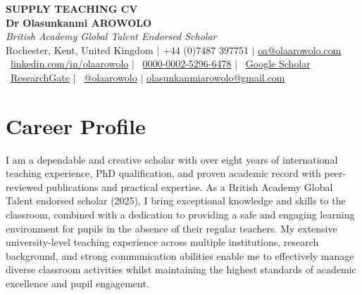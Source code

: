 \documentclass[a4paper,11pt]{article}
\begin{document}
\begin{center}
    \textbf{\Huge \scshape SUPPLY TEACHING CV} \\
    \vspace{5pt}
    \textbf{\Large Dr Olasunkanmi AROWOLO} \\ \vspace{1pt}
    \small \textit{British Academy Global Talent Endorsed Scholar} \\
    \vspace{1pt}
    \small Rochester, Kent, United Kingdom $|$ +44 (0)7487 397751 $|$ \href{mailto:oa@olaarowolo.com}{oa@olaarowolo.com} \\
    \vspace{3pt}
    \small \faLinkedin\ \href{https://www.linkedin.com/in/olaarowolo/}{linkedin.com/in/olaarowolo} $|$ 
    \faOrcid\ \href{https://orcid.org/0000-0002-5296-6478}{0000-0002-5296-6478} $|$ 
    \faGraduationCap\ \href{https://scholar.google.com/citations?user=3N_RQWoAAAAJ&hl=en}{Google Scholar} \\
    \vspace{2pt}
    \small \faResearchgate\ \href{https://www.researchgate.net/profile/Sunday-Arowolo}{ResearchGate} $|$
    \faTwitter\ \href{https://twitter.com/olaarowolo}{@olaarowolo} $|$ \href{mailto:olasunkanmiarowolo@gmail.com}{olasunkanmiarowolo@gmail.com}
\end{center}

\raggedright


\section{Career Profile}
I am a dependable and creative scholar with over eight years of international teaching experience, PhD qualification, and proven academic record with peer-reviewed publications and practical expertise. As a British Academy Global Talent endorsed scholar (2025), I bring exceptional knowledge and skills to the classroom, combined with a dedication to providing a safe and engaging learning environment for pupils in the absence of their regular teachers. My extensive university-level teaching experience across multiple institutions, research background, and strong communication abilities enable me to effectively manage diverse classroom activities whilst maintaining the highest standards of academic excellence and pupil engagement.
\end{document}
